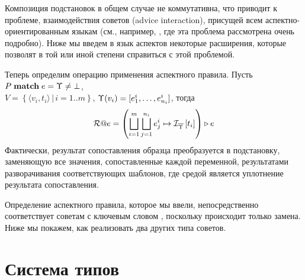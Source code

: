 \begin{Note}
Композиция подстановок в общем случае не коммутативна, что приводит к проблеме, взаимодействия советов (advice interaction), присущей всем аспектно-ориентированным языкам (см., например, \cite{JAMI}, где эта проблема рассмотрена очень подробно). Ниже мы введем в язык аспектов некоторые расширения, которые позволят в той или иной степени справиться с этой проблемой.
\end{Note}

Теперь определим операцию применения аспектного правила.
Пусть $P \; \mathbf{match} \; e = \Upsilon \neq \bot$, \\$V = \left\{\langle v_i, t_i \rangle \,|\, i = 1..m \right\}$,  $\Upsilon(v_i) = [e^i_1, \ldots, e^i_{n_i}]$, тогда
	$$\mathcal{R}@e
		= \left( \bigsqcup\limits_{i=1}^{m} \bigsqcup\limits_{j=1}^{n_i}
			e^i_j \mapsto \mathcal{I}_{\overline{\Upsilon}} \left[ t_i \right] \right) \triangleright e$$
Фактически, результат сопоставления образца преобразуется в подстановку, заменяющую все значения, сопоставленные каждой переменной, результатами разворачивания соответствующих шаблонов, где средой является уплотнение результата сопоставления.

\begin{Note}
Определение аспектного правила, которое мы ввели, непосредственно соответствует советам с ключевым словом , поскольку происходит только замена. Ниже мы покажем, как реализовать два других типа советов.
\end{Note}


\section{Система типов}

